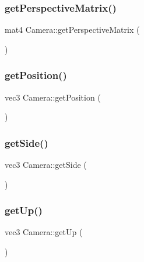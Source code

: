\mbox{\label{classCamera_ad181799f11038f16667aa53bb5b68945}} 
\subsubsection{\texorpdfstring{get\+Perspective\+Matrix()}{getPerspectiveMatrix()}}
{\footnotesize\ttfamily mat4 Camera\+::get\+Perspective\+Matrix (\begin{DoxyParamCaption}{ }\end{DoxyParamCaption})}

\mbox{\label{classCamera_a4ab9f56675dc67486c0ce95086bda56d}} 
\subsubsection{\texorpdfstring{get\+Position()}{getPosition()}}
{\footnotesize\ttfamily vec3 Camera\+::get\+Position (\begin{DoxyParamCaption}{ }\end{DoxyParamCaption})}

\mbox{\label{classCamera_adbd8e27eae5a396f5f96a69a513f4cd6}} 
\subsubsection{\texorpdfstring{get\+Side()}{getSide()}}
{\footnotesize\ttfamily vec3 Camera\+::get\+Side (\begin{DoxyParamCaption}{ }\end{DoxyParamCaption})}

\mbox{\label{classCamera_a20bc33698379856dc3a146f4191ae7d0}} 
\subsubsection{\texorpdfstring{get\+Up()}{getUp()}}
{\footnotesize\ttfamily vec3 Camera\+::get\+Up (\begin{DoxyParamCaption}{ }\end{DoxyParamCaption})}


